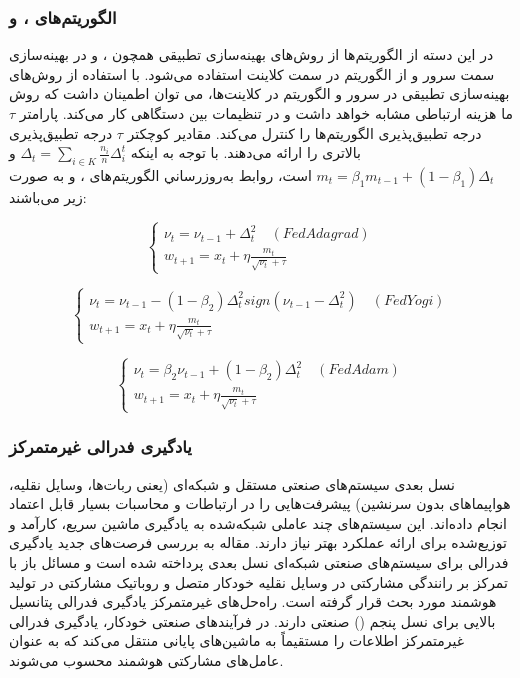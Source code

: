 \subsubsection{الگوریتم‌های ،  و }

در این دسته از الگوریتم‌ها از روش‌های بهینه‌سازی تطبیقی همچون ،  و  در بهینه‌سازی سمت سرور و از الگوریتم  در سمت کلاینت استفاده می‌شود. با استفاده از روش‌های بهینه‌سازی تطبیقی در سرور و الگوریتم  در کلاینت‌ها، می توان اطمینان داشت که روش ما هزینه ارتباطی مشابه  خواهد داشت و در تنظیمات بین دستگاهی کار می‌کند. پارامتر $\tau$ درجه تطبیق‌پذیری الگوریتم‌ها را کنترل می‌کند. مقادیر کوچکتر $\tau$ درجه تطبیق‌پذیری بالاتری را ارائه می‌دهند. با توجه به اینکه $\Delta_t=\sum_{i\in K}\frac{n_i}{n}\Delta_i^t$ و $m_t=\beta_1 m_{t-1}+(1-\beta_1)\Delta_t$ است، روابط به‌روزرساني الگوریتم‌های ،  و  به صورت زیر می‌باشند:


\begin{equation}\label{e124}
		\begin{cases}
		\nu_t =\nu_{t-1}+\Delta_t^2 \quad (FedAdagrad)\\
		w_{t+1}=x_t+\eta\frac{m_t}{\sqrt{\nu_t}+\tau}
	\end{cases}
\end{equation}

\begin{equation}\label{e125}
	\begin{cases}
		\nu_t =\nu_{t-1}-(1-\beta_2)\Delta_t^2 sign(\nu_{t-1}-\Delta_t^2) \quad (FedYogi)\\
		w_{t+1}=x_t+\eta\frac{m_t}{\sqrt{\nu_t}+\tau}
	\end{cases}
\end{equation}

\begin{equation}\label{e126}
	\begin{cases}
		\nu_t =\beta_2\nu_{t-1}+(1-\beta_2)\Delta_t^2 \quad (FedAdam)\\
		w_{t+1}=x_t+\eta\frac{m_t}{\sqrt{\nu_t}+\tau}
	\end{cases}
\end{equation}

\subsubsection{یادگیری فدرالی غیرمتمرکز}
نسل بعدی سیستم‌های صنعتی مستقل و شبکه‌ای (یعنی ربات‌ها، وسایل نقلیه، هواپیماهای بدون سرنشین) پیشرفت‌هایی را در ارتباطات و محاسبات بسیار قابل اعتماد انجام داده‌اند. این سیستم‌های چند عاملی شبکه‌شده به یادگیری ماشین سریع، کارآمد و توزیع‌شده برای ارائه عملکرد بهتر نیاز دارند. مقاله \cite{Fed9} به بررسی فرصت‌های جدید یادگیری فدرالی برای سیستم‌های صنعتی شبکه‌ای نسل بعدی پرداخته شده است و مسائل باز با تمرکز بر رانندگی مشارکتی در وسایل نقلیه خودکار متصل و روباتیک مشارکتی در تولید هوشمند مورد بحث قرار گرفته است. راه‌حل‌های غیرمتمرکز یادگیری فدرالی پتانسیل بالایی برای نسل پنجم () صنعتی دارند. در فرآیندهای صنعتی خودکار، یادگیری فدرالی غیرمتمرکز اطلاعات را مستقیماً به ماشین‌های پایانی منتقل می‌کند که به عنوان عامل‌های مشارکتی هوشمند محسوب می‌شوند.

